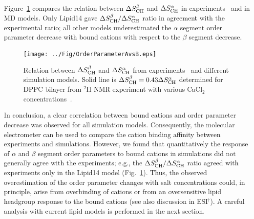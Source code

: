 \documentclass[twoside,twocolumn,9pt]{article}
\begin{document}
Figure~\ref{AvsB} compares the relation between $\Delta S_{\rm{CH}}^{\beta}$ and $\Delta S_{\rm{CH}}^{\alpha}$
in experiments~\cite{akutsu81} and in MD models.
Only Lipid14 gave $\Delta S_{\rm{CH}}^{\beta}/\Delta S_{\rm{CH}}^{\alpha}$ ratio in agreement with the experimental ratio;
all other models underestimated the $\alpha$ segment order parameter decrease with bound cations with
respect to the $\beta$ segment decrease.
\begin{figure}[t]
  \centering
  \texttt{[image: ../Fig/OrderParameterAvsB.eps]}
  \caption{\label{AvsB}
    Relation between $\Delta S_{\rm{CH}}^{\beta}$ and $\Delta S_{\rm{CH}}^{\alpha}$ from experiments~\cite{akutsu81} and
    different simulation models. Solid line is $\Delta S_{\rm{CH}}^{\beta}=0.43\Delta S_{\rm{CH}}^{\alpha}$ determined for DPPC bilayer
    from $^2$H NMR experiment with various CaCl$_2$ concentrations~\cite{akutsu81}.
  }
\end{figure}

In conclusion, a clear correlation between bound cations and order parameter decrease 
was observed for all simulation models. Consequently, the molecular electrometer can 
be used to compare the cation binding affinity between experiments and simulations. 
However, we found that quantitatively the response of $\alpha$ and $\beta$ segment order parameters to bound cations in simulations 
did not generally agree with the experiments; e.g., the $\Delta S_{\rm{CH}}^{\beta}/\Delta S_{\rm{CH}}^{\alpha}$ ratio  
agreed with experiments only in the Lipid14 model (Fig.~\ref{AvsB}).
Thus, the observed overestimation of the order parameter changes with salt concentrations could, in principle, arise
from overbinding of cations or from an oversensitive lipid headgroup response to the bound cations
(see also discussion in ESI$^\dag$). 
A careful analysis with current lipid models is performed in the next section.
\end{document}
